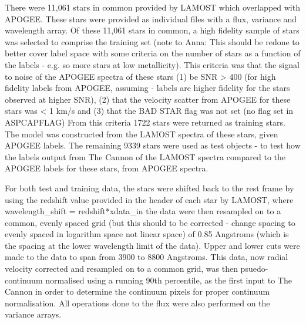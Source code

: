There were 11,061 stars in common provided by LAMOST which overlapped with APOGEE. These stars were provided as individual files with a flux, variance and wavelength array. 
Of these 11,061 stars in common, a high fidelity sample of stars was selected to comprise the training set (note to Anna: This should be redone to better cover label space with some criteria on the
number of stars as a function of the labels - e.g. so more stars at low metallicity).
This criteria was that the signal to noise of the APOGEE spectra of these stars (1) be SNR > 400 (for high fidelity labels from APOGEE, assuming - labels are higher fidelity for the stars observed at
higher SNR), (2) that the velocity scatter from
APOGEE for these stars was < 1 km/s and (3) that the BAD STAR flag was not set (no flag set in ASPCAPFLAG)
From this criteria 1722 stars were returned as training stars. The model was constructed from the LAMOST spectra of these stars, given APOGEE labels.  
The remaining 9339 stars were used as test objects - to test how the labels output from The Cannon of the LAMOST spectra compared to the APOGEE labels for these stars, from APOGEE spectra. 

For both test and training data, the stars were shifted back to the rest frame by using the redshift value provided in the header of each star by LAMOST, where 
wavelength_shift = redshift*xdata_in 
the data were then resampled on to a common, evenly spaced grid (but this should to be corrected - change spacing to evenly spaced in logarithm space not linear space) of 0.85 Angstroms (which is the spacing at the
lower wavelength limit of the data). Upper and lower cuts were made to the data to span from 3900 to 8800 Angstroms. 
This data, now radial velocity corrected and resampled on to a common grid, was then psuedo-continuum normalised using a running 90th percentile, as the first input to The Cannon in order to determine
the continuum pixels for proper continuum normalisation. 
All operations done to the flux were also performed on the variance arrays. 

